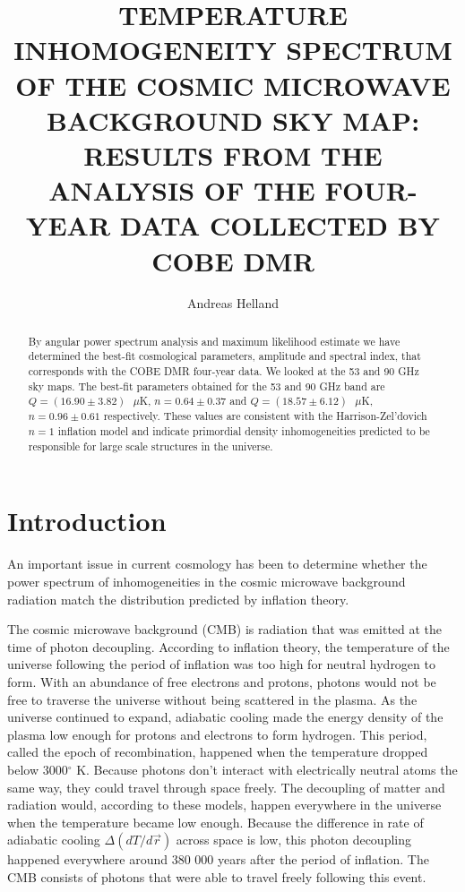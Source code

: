 \documentclass{emulateapj}
\begin{document}
	
	\title{TEMPERATURE INHOMOGENEITY SPECTRUM OF THE COSMIC MICROWAVE BACKGROUND SKY MAP: RESULTS FROM THE ANALYSIS OF THE FOUR-YEAR DATA COLLECTED BY COBE DMR} 

	
	\author{Andreas Helland}
	
	
	
	


\begin{abstract}
By angular power spectrum analysis and maximum likelihood estimate we have determined the best-fit cosmological parameters, amplitude and spectral index, that corresponds with the COBE DMR four-year data. We looked at the 53 and 90 GHz sky maps. The best-fit parameters obtained for the 53 and 90 GHz band are  $Q = (16.90 \pm 3.82) \text{ }\mu$K, $n = 0.64 \pm  0.37$ and $Q = (18.57 \pm 6.12) \text{ }\mu$K, $n = 0.96 \pm 0.61$ respectively. These values are consistent with the Harrison-Zel'dovich $n = 1$ inflation model and indicate primordial density inhomogeneities predicted to be responsible for large scale structures in the universe.
\end{abstract}




\section{Introduction}
\label{sec:introduction}

An important issue in current cosmology has been to determine whether the power spectrum of inhomogeneities in the cosmic microwave background radiation match the distribution predicted by inflation theory. 

The cosmic microwave background (CMB) is radiation that was emitted at the time of photon decoupling. According to inflation theory, the temperature of the universe following the period of inflation was too high for neutral hydrogen to form. With an abundance of free electrons and protons, photons would not be free to traverse the universe without being scattered in the plasma. As the universe continued to expand, adiabatic cooling made the energy density of the plasma low enough for protons and electrons to form hydrogen. This period, called the epoch of recombination, happened when the temperature dropped below 3000$^\circ$ K. Because photons don't interact with electrically neutral atoms the same way, they could travel through space freely. The decoupling of matter and radiation would, according to these models, happen everywhere in the universe when the temperature became low enough. Because the difference in rate of adiabatic cooling $\Delta(dT/d\vec{r})$ across space is low, this photon decoupling happened everywhere around 380 000 years after the period of inflation. The CMB consists of photons that were able to travel freely following this event. 
\end{document}
